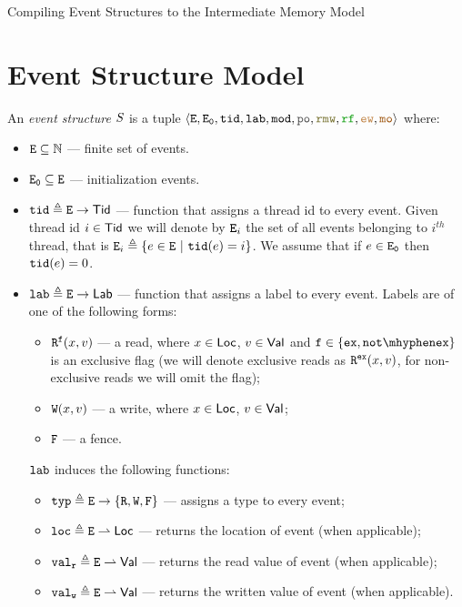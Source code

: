 \documentclass[12pt]{article}
\begin{document}
\begin{center}
{\center \LARGE Compiling Event Structures to the Intermediate Memory Model }
\end{center}

\section{Event Structure Model}

\begin{definition}
  \label{def:es}
  
  An \emph{event structure} $\lES$ is a tuple
  $\tup{\lE, \lEi, \lTID, \lLAB, \lMOD, \lPO, \lRMW, \lRF, \lEW, \lMO}$ where:
  \begin{itemize}
  \item $\lE \subseteq \N$ --- finite set of events. 
  \item $\lEi \subseteq \lE$ --- initialization events.
  \item $\lTID \defeq \lE \fun \Tid$ --- function that assigns a thread id to every event.
    Given thread id $i \in \Tid$ we will denote by $\lE_i$ the set of all events belonging 
    to $i^{th}$ thread, that is $\lE_i \defeq \{e \in \lE ~|~ \lTID(e) = i\}$.
    We assume that if $e \in \lEi$ then $\lTID(e) = 0$.
  \item $\lLAB \defeq \lE \fun \Lab$ --- function that assigns a label to every event.
    Labels are of one of the following forms:
    \begin{itemize}
    \item $\rlabExExpl{x}{v}{\mathtt{f}}$ --- a read, where $x \in \Loc$, $v \in \Val$ 
      and $\mathtt{f} \in \{\Ex, \NotEx\}$ is an exclusive flag 
      (we will denote exclusive reads as $\rlabEx{x}{v}$,
       for non-exclusive reads we will omit the flag);
    \item $\wlab{x}{v}$ --- a write, where $x \in \Loc$, $v \in \Val$;
    \item $\flab$ --- a fence.
    \end{itemize}
    $\lLAB$ induces the following functions:
    \begin{itemize}
    \item $\lTYP \defeq \lE \fun \{\lR, \lW, \lF\}$ --- assigns a type to every event;
    \item $\lLOC \defeq \lE \pfun \Loc $ --- returns the location of event (when applicable);
    \item $\lVALR \defeq \lE \pfun \Val$ --- returns the read value of event (when applicable);
    \item $\lVALW \defeq \lE \pfun \Val$ --- returns the written value of event (when applicable).

\end{itemize}
\end{itemize}
\end{definition}
\end{document}
